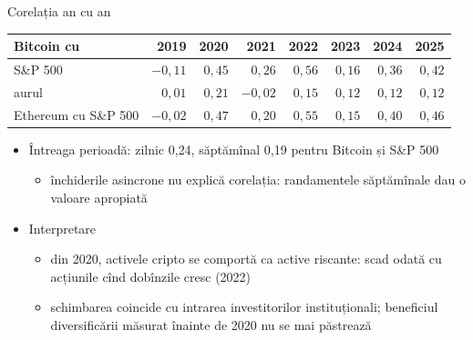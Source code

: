 \begin{frame}{Corelația an cu an}
\itemsize{\footnotesize}
\begin{center}
\scriptsize
\begin{tabular}{lrrrrrrr}
\toprule
Bitcoin cu & 2019 & 2020 & 2021 & 2022 & 2023 & 2024 & 2025 \\
\midrule
S\&P 500 & $-0{,}11$ & $0{,}45$ & $0{,}26$ & $0{,}56$ & $0{,}16$ & $0{,}36$ & $0{,}42$ \\
aurul & $0{,}01$ & $0{,}21$ & $-0{,}02$ & $0{,}15$ & $0{,}12$ & $0{,}12$ & $0{,}12$ \\
Ethereum cu S\&P 500 & $-0{,}02$ & $0{,}47$ & $0{,}20$ & $0{,}55$ & $0{,}15$ & $0{,}40$ & $0{,}46$ \\
\bottomrule
\end{tabular}
\end{center}
\begin{itemize}
    \item Întreaga perioadă: zilnic 0{,}24, săptămînal 0{,}19 pentru Bitcoin și S\&P 500
    \begin{itemize}
        \item închiderile asincrone nu explică corelația: randamentele săptămînale dau o valoare apropiată
    \end{itemize}
    \item Interpretare
    \begin{itemize}
        \item din 2020, activele cripto se comportă ca active riscante: scad odată cu acțiunile cînd dobînzile cresc (2022)
        \item schimbarea coincide cu intrarea investitorilor instituționali; beneficiul diversificării măsurat înainte de 2020 nu se mai păstrează
    \end{itemize}
\end{itemize}
\end{frame}

